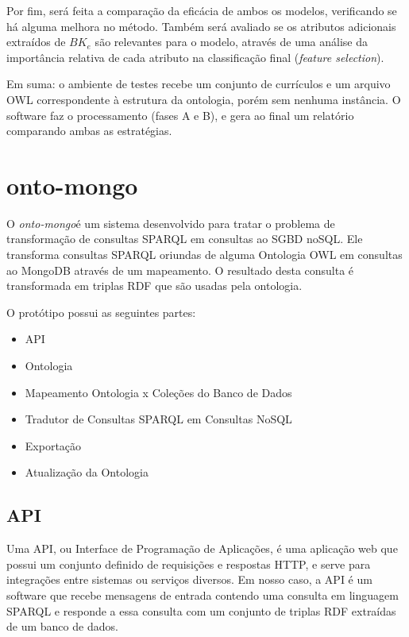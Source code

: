 Por fim, será feita a comparação da eficácia de ambos os modelos, verificando se há alguma melhora no método. Também será avaliado se os atributos adicionais extraídos de $BK_e$ são relevantes para o modelo, através de uma análise da importância relativa de cada atributo na classificação final (\textit{feature selection}).

Em suma: o ambiente de testes recebe um conjunto de currículos e um arquivo OWL correspondente à estrutura da ontologia, porém sem nenhuma instância. O software faz o processamento (fases A e B), e gera ao final um relatório comparando ambas as estratégias.


\section{onto-mongo}
\label{sec:onto-mongo}

O \textit{onto-mongo}\footnotemark é um sistema desenvolvido para tratar o
problema de transformação de consultas SPARQL em consultas ao SGBD noSQL. Ele
transforma consultas SPARQL oriundas de alguma Ontologia OWL em consultas ao
MongoDB através de um mapeamento. O resultado desta consulta é transformada em
triplas RDF que são usadas pela ontologia.


O protótipo possui as seguintes partes:
\begin{itemize}
    \item API
    \item Ontologia %
    \item Mapeamento Ontologia x Coleções do Banco de Dados
    \item Tradutor de Consultas SPARQL em Consultas NoSQL
    \item Exportação
    \item Atualização da Ontologia %
\end{itemize}

\subsection{API}
Uma API, ou Interface de Programação de Aplicações, é uma aplicação web que
possui um conjunto definido de requisições e respostas HTTP, e serve para
integrações entre sistemas ou serviços diversos. Em nosso caso, a API é um
software que recebe mensagens de entrada contendo uma consulta em linguagem SPARQL
e responde a essa consulta com um conjunto de triplas RDF extraídas de um banco
de dados.

